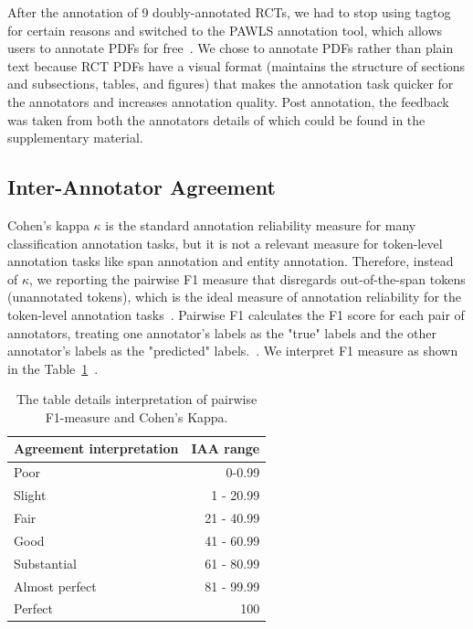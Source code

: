 \documentclass[sn-mathphys,Numbered]{sn-jnl}%
\theoremstyle{thmstyleone}%
\theoremstyle{thmstyletwo}%
\theoremstyle{thmstylethree}%
\begin{document}
After the annotation of 9 doubly-annotated RCTs, we had to stop using tagtog for certain reasons and switched to the PAWLS annotation tool, which allows users to annotate PDFs for free~\cite{neumann2021pawls}.
We chose to annotate PDFs rather than plain text because RCT PDFs have a visual format (maintains the structure of sections and subsections, tables, and figures) that makes the annotation task quicker for the annotators and increases annotation quality.
Post annotation, the feedback was taken from both the annotators details of which could be found in the supplementary material. %
%
%
%
\subsection{Inter-Annotator Agreement}
\label{subsec:corpus}
%
Cohen's kappa $\kappa$ is the standard annotation reliability measure for many classification annotation tasks, but it is not a relevant measure for token-level annotation tasks like span annotation and entity annotation.
Therefore, instead of $\kappa$, we reporting the pairwise F1 measure that disregards out-of-the-span tokens (unannotated tokens), which is the ideal measure of annotation reliability for the token-level annotation tasks~\cite{deleger2012building}.
Pairwise F1 calculates the F1 score for each pair of annotators, treating one annotator's labels as the "true" labels and the other annotator's labels as the "predicted" labels.~\cite{brandsen2020creating}.
We interpret F1 measure as shown in the Table~\ref{tab:iaa_interpret}~\cite{landis1977measurement}.


%
%
%
\begin{center}
 \begin{table}[ht]
   \caption{The table details interpretation of pairwise F1-measure and Cohen's Kappa.}\label{tab:iaa_interpret}
 \centering
    \begin{tabular}{|l|r|}
    \hline
    Agreement interpretation & IAA range \\ 
    \hline
    \hline
        Poor & 0-0.99 \\ 
        Slight & 1 - 20.99 \\ 
        Fair & 21 - 40.99 \\ 
        Good & 41 - 60.99 \\ 
        Substantial & 61 - 80.99 \\ 
        Almost perfect & 81 - 99.99 \\ 
        Perfect & 100 \\ 
    \hline
    \end{tabular}
 \end{table}   
\end{center}
%
%
%
%
%
%
\end{document}
